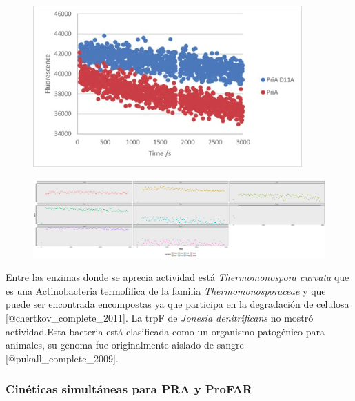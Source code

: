 \documentclass[]{article}
\begin{document}
{\begin{figure}[h!tbp]
\centering
\includegraphics[angle = 0,scale = 0.8]{chapter4/MutantControl.png}
\caption[Scoe and non functional Scoe PriA acting on dGTP]{\footnotesize{}}
\label{fig:PriARutas1}
\end{figure}

\begin{figure}[h!tbp]
\centering
\includegraphics[angle = 0,scale = 0.6]{chapter4/GTPCinetica.pdf}
\caption[Scoe and non functional Scoe PriA acting on dGTP]{\footnotesize{}}
\label{fig:PriARutas2}
\end{figure}

\clearpage  

Entre las enzimas donde se aprecia actividad está \emph{Thermomonospora
curvata} que es una Actinobacteria termofílica de la familia
\emph{Thermomonosporaceae} y que puede ser encontrada encompostas ya que
participa en la degradación de celulosa {[}@chertkov\_complete\_2011{]}.
La trpF de \emph{Jonesia denitrificans} no mostró actividad.Esta
bacteria está clasificada como un organismo patogénico para animales, su
genoma fue originalmente aislado de sangre
{[}@pukall\_complete\_2009{]}.

\clearpage 

\subsubsection{Cinéticas simultáneas para PRA y
ProFAR}\label{cineticas-simultaneas-para-pra-y-profar}

}
\end{document}
